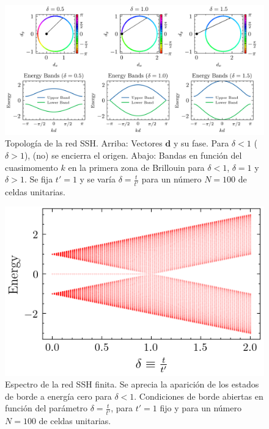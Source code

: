 \begin{figure}[h]
	\centering
	\includegraphics[width=\linewidth]{media/ssh-winding}
	\caption[Topología de la red SSH.]{Topología de la red SSH. Arriba: Vectores $\textbf{d}$ y su fase. Para $\delta < 1$ ($\delta > 1$), (no) se encierra el origen. Abajo: Bandas en función del cuasimomento $k$ en la primera zona de Brillouin para $\delta < 1$, $\delta = 1$ y $\delta > 1$. Se fija $t'=1$ y se varía $\delta=\frac{t}{t'}$ para un número $N=100$ de celdas unitarias. 
	\label{fig:ssh-topo}}
\end{figure} \begin{figure}[h]
\centering	\includegraphics[width=0.7\linewidth]{media/ssh-open}
	\caption[Espectro de la red SSH.]{Espectro de la red SSH finita. Se aprecia la aparición de los estados de borde a energía cero para $\delta < 1$. Condiciones de borde abiertas en función del parámetro $\delta=\frac{t}{t'}$, para $t'=1$ fijo y para un número $N=100$ de celdas unitarias.
	\label{fig:ssh-open}}
\end{figure} 
